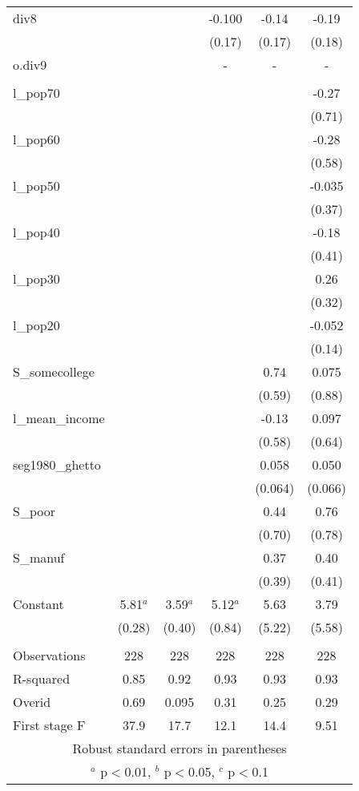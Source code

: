 \documentclass[]{article}
\begin{document}
\begin{tabular}{lccccc}
div8 &  &  & -0.100 & -0.14 & -0.19 \\
 &  &  & (0.17) & (0.17) & (0.18) \\
o.div9 &  &  & - & - & - \\
 &  &  &  &  &  \\
l\_pop70 &  &  &  &  & -0.27 \\
 &  &  &  &  & (0.71) \\
l\_pop60 &  &  &  &  & -0.28 \\
 &  &  &  &  & (0.58) \\
l\_pop50 &  &  &  &  & -0.035 \\
 &  &  &  &  & (0.37) \\
l\_pop40 &  &  &  &  & -0.18 \\
 &  &  &  &  & (0.41) \\
l\_pop30 &  &  &  &  & 0.26 \\
 &  &  &  &  & (0.32) \\
l\_pop20 &  &  &  &  & -0.052 \\
 &  &  &  &  & (0.14) \\
S\_somecollege &  &  &  & 0.74 & 0.075 \\
 &  &  &  & (0.59) & (0.88) \\
l\_mean\_income &  &  &  & -0.13 & 0.097 \\
 &  &  &  & (0.58) & (0.64) \\
seg1980\_ghetto &  &  &  & 0.058 & 0.050 \\
 &  &  &  & (0.064) & (0.066) \\
S\_poor &  &  &  & 0.44 & 0.76 \\
 &  &  &  & (0.70) & (0.78) \\
S\_manuf &  &  &  & 0.37 & 0.40 \\
 &  &  &  & (0.39) & (0.41) \\
Constant & 5.81$^a$ & 3.59$^a$ & 5.12$^a$ & 5.63 & 3.79 \\
 & (0.28) & (0.40) & (0.84) & (5.22) & (5.58) \\
 &  &  &  &  &  \\
Observations & 228 & 228 & 228 & 228 & 228 \\
R-squared & 0.85 & 0.92 & 0.93 & 0.93 & 0.93 \\
Overid & 0.69 & 0.095 & 0.31 & 0.25 & 0.29 \\
 First stage F & 37.9 & 17.7 & 12.1 & 14.4 & 9.51 \\ \hline
\multicolumn{6}{c}{ Robust standard errors in parentheses} \\
\multicolumn{6}{c}{ $^a$ p$<$0.01, $^b$ p$<$0.05, $^c$ p$<$0.1} \\
\end{tabular}
\end{document}
